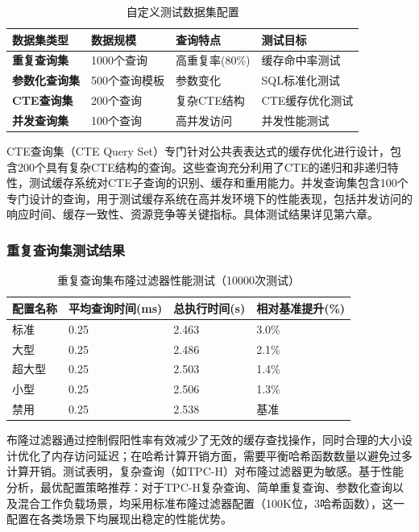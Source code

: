 \begin{table}[!htb]
    \caption{自定义测试数据集配置}
    \label{table3_7}
    \centering
    \begin{tabular}{p{3cm}p{3cm}p{3cm}p{4cm}}
        \hline
        数据集类型 & 数据规模 & 查询特点 & 测试目标 \\
        \hline
        \textbf{重复查询集} & 1000个查询 & 高重复率(80\%) & 缓存命中率测试 \\
        \textbf{参数化查询集} & 500个查询模板 & 参数变化 & SQL标准化测试 \\
        \textbf{CTE查询集} & 200个查询 & 复杂CTE结构 & CTE缓存优化测试 \\
        \textbf{并发查询集} & 100个查询 & 高并发访问 & 并发性能测试 \\
        \hline
    \end{tabular}
\end{table}

CTE查询集（CTE Query Set）专门针对公共表表达式的缓存优化进行设计，包含200个具有复杂CTE结构的查询。这些查询充分利用了CTE的递归和非递归特性，测试缓存系统对CTE子查询的识别、缓存和重用能力。并发查询集包含100个专门设计的查询，用于测试缓存系统在高并发环境下的性能表现，包括并发访问的响应时间、缓存一致性、资源竞争等关键指标。具体测试结果详见第六章。

\subsubsection{重复查询集测试结果}

\begin{table}[!htb]
    \caption{重复查询集布隆过滤器性能测试（10000次测试）}
    \label{table3_8}
    \centering
    \begin{tabular}{p{3cm}p{3cm}p{3cm}p{3cm}}
        \hline
        配置名称 & 平均查询时间(ms) & 总执行时间(s) & 相对基准提升(\%) \\
        \hline
        标准 & 0.25 & 2.463 & 3.0\% \\
        大型 & 0.25 & 2.486 & 2.1\% \\
        超大型 & 0.25 & 2.503 & 1.4\% \\
        小型 & 0.25 & 2.506 & 1.3\% \\
        禁用 & 0.25 & 2.538 & 基准 \\
        \hline
    \end{tabular}
\end{table}

布隆过滤器通过控制假阳性率有效减少了无效的缓存查找操作，同时合理的大小设计优化了内存访问延迟；在哈希计算开销方面，需要平衡哈希函数数量以避免过多计算开销。测试表明，复杂查询（如TPC-H）对布隆过滤器更为敏感。基于性能分析，最优配置策略推荐：对于TPC-H复杂查询、简单重复查询、参数化查询以及混合工作负载场景，均采用标准布隆过滤器配置（100K位，3哈希函数），这一配置在各类场景下均展现出稳定的性能优势。


